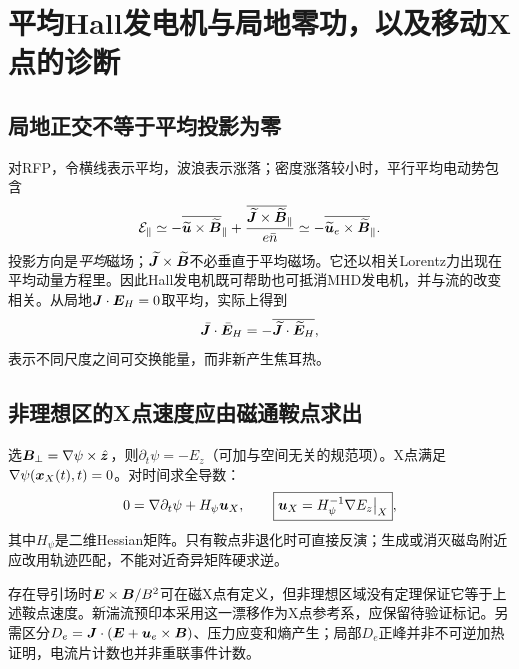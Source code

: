 \section{平均Hall发电机与局地零功，以及移动X点的诊断}
\subsection{局地正交不等于平均投影为零}
对RFP，令横线表示平均，波浪表示涨落；密度涨落较小时，平行平均电动势包含
\begin{equation}
 \mathcal E_\parallel\simeq
 -\overline{\widetilde{\bm{u}}\times\widetilde{\bm{B}}}_\parallel
 +{\overline{\widetilde{\bm{J}}\times\widetilde{\bm{B}}}_\parallel\over e\bar n}
 \simeq-\overline{\widetilde{\bm{u}}_e\times\widetilde{\bm{B}}}_\parallel.
\end{equation}
投影方向是\emph{平均}磁场；$\widetilde{\bm{J}}\times\widetilde{\bm{B}}$不必垂直于平均磁场。它还以相关Lorentz力出现在平均动量方程里。因此Hall发电机既可帮助也可抵消MHD发电机，并与流的改变相关\citep{F798}。从局地$\bm{J}\cdot\bm{E}_H=0$取平均，实际上得到
\begin{equation}
 \bar{\bm{J}}\cdot\bar{\bm{E}}_H=-\overline{\widetilde{\bm{J}}\cdot\widetilde{\bm{E}}_H},
\end{equation}
表示不同尺度之间可交换能量，而非新产生焦耳热。

\subsection{非理想区的X点速度应由磁通鞍点求出}
选$\bm{B}_\perp=\nabla\psi\times\hat{\bm{z}}$，则$\partial_t\psi=-E_z$（可加与空间无关的规范项）。X点满足$\nabla\psi(\bm{x}_X(t),t)=0$。对时间求全导数：
\begin{equation}
 0=\nabla\partial_t\psi+H_\psi\bm{u}_X,
 \qquad\boxed{\bm{u}_X=H_\psi^{-1}\nabla E_z\big|_X},
\end{equation}
其中$H_\psi$是二维Hessian矩阵。只有鞍点非退化时可直接反演；生成或消灭磁岛附近应改用轨迹匹配，不能对近奇异矩阵硬求逆。

存在导引场时$\bm{E}\times\bm{B}/B^2$可在磁X点有定义，但非理想区域没有定理保证它等于上述鞍点速度。新湍流预印本采用这一漂移作为X点参考系\citep{F655}，应保留待验证标记。另需区分$D_e=\bm{J}\cdot(\bm{E}+\bm{u}_e\times\bm{B})$、压力应变和熵产生；局部$D_e$正峰并非不可逆加热证明，电流片计数也并非重联事件计数。
